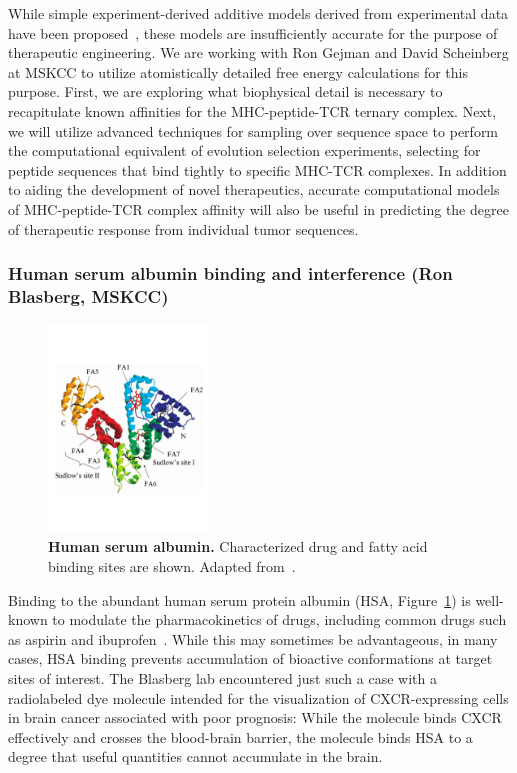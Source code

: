 \documentclass[10pt]{article}
\begin{document}
While simple experiment-derived additive models derived from experimental data have been proposed~\cite{Birnbaum:2014:Cell}, these models are insufficiently accurate for the purpose of therapeutic engineering.
We are working with Ron Gejman and David Scheinberg at MSKCC to utilize atomistically detailed free energy calculations for this purpose.
First, we are exploring what biophysical detail is necessary to recapitulate known affinities for the MHC-peptide-TCR ternary complex.
Next, we will utilize advanced techniques for sampling over sequence space to perform the computational equivalent of evolution selection experiments, selecting for peptide sequences that bind tightly to specific MHC-TCR complexes.
In addition to aiding the development of novel therapeutics, accurate computational models of MHC-peptide-TCR complex affinity will also be useful in predicting the degree of therapeutic response from individual tumor sequences.

\vspace{-0.3cm}
\subsubsection*{Human serum albumin binding and interference (Ron Blasberg, MSKCC)}
\vspace{-0.3cm}

\begin{figure}
\vspace{-2.3cm}
\includegraphics[width=0.38\textwidth]{figures/hsa-binding-sites.pdf}
\vspace{-2.5cm}
\caption{\footnotesize \label{figure:hsa} {\bf Human serum albumin.}
Characterized drug and fatty acid binding sites are shown.
Adapted from~\cite{fasano:iubmb-life:2005:hsa-review}.}
\end{figure}

Binding to the abundant human serum protein albumin (HSA, Figure~\ref{figure:hsa}) is well-known to modulate the pharmacokinetics of drugs, including common drugs such as aspirin and ibuprofen~\cite{fasano:iubmb-life:2005:hsa-review}.
While this may sometimes be advantageous, in many cases, HSA binding prevents accumulation of bioactive conformations at target sites of interest.
The Blasberg lab encountered just such a case with a radiolabeled dye molecule intended for the visualization of CXCR-expressing cells in brain cancer associated with poor prognosis: While the molecule binds CXCR effectively and crosses the blood-brain barrier, the molecule binds HSA to a degree that useful quantities cannot accumulate in the brain.
\end{document}
